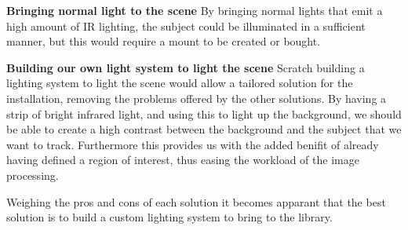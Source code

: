 \textbf{Bringing normal light to the scene} 
By bringing normal lights that emit a high amount of IR lighting, the subject could be illuminated in a sufficient manner, but this would require a mount to be created or bought.

\textbf{Building our own light system to light the scene}
Scratch building a lighting system to light the scene would allow a tailored solution for the installation, removing the problems offered by the other solutions. By having a strip of bright infrared light, and using this to light up the background, we should be able to create a high contrast between the background and the subject that we want to track. Furthermore this provides us with the added benifit of already having defined a region of interest, thus easing the workload of the image processing. 

Weighing the pros and cons of each solution it becomes apparant that the best solution is to build a custom lighting system to bring to the library. 